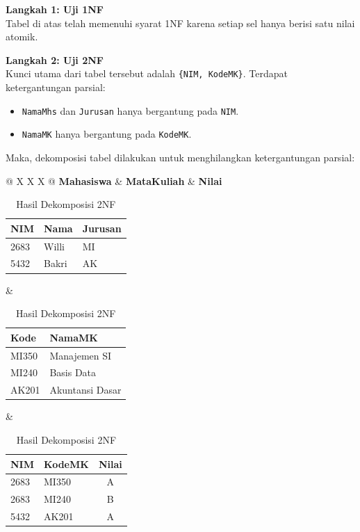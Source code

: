 \documentclass[11pt,a4paper]{article}
\begin{document}
\textbf{Langkah 1: Uji 1NF} \\
Tabel di atas telah memenuhi syarat 1NF karena setiap sel hanya berisi satu nilai atomik.

\textbf{Langkah 2: Uji 2NF} \\
Kunci utama dari tabel tersebut adalah \texttt{\{NIM, KodeMK\}}. Terdapat ketergantungan parsial:
\begin{itemize}
	\item \texttt{NamaMhs} dan \texttt{Jurusan} hanya bergantung pada \texttt{NIM}.
	\item \texttt{NamaMK} hanya bergantung pada \texttt{KodeMK}.
\end{itemize}
Maka, dekomposisi tabel dilakukan untuk menghilangkan ketergantungan parsial:

\begin{table}[H]
	\centering
	\small
	\caption{Hasil Dekomposisi 2NF}
	\begin{tabularx}{\textwidth}{@{} X X X @{}}
		\toprule
		\textbf{Mahasiswa} & \textbf{MataKuliah} & \textbf{Nilai} \\
		\midrule
		\begin{tabular}[t]{@{}lll@{}}
			\toprule
			NIM  & Nama  & Jurusan \\
			\midrule
			2683 & Willi & MI      \\
			5432 & Bakri & AK      \\
			\bottomrule
		\end{tabular}
		                   &
		\begin{tabular}[t]{@{}ll@{}}
			\toprule
			Kode  & NamaMK          \\
			\midrule
			MI350 & Manajemen SI    \\
			MI240 & Basis Data      \\
			AK201 & Akuntansi Dasar \\
			\bottomrule
		\end{tabular}
		                   &
		\begin{tabular}[t]{@{}llc@{}}
			\toprule
			NIM  & KodeMK & Nilai \\
			\midrule
			2683 & MI350  & A     \\
			2683 & MI240  & B     \\
			5432 & AK201  & A     \\
			\bottomrule
		\end{tabular}                              \\
		\bottomrule
	\end{tabularx}
\end{table}
\end{document}
